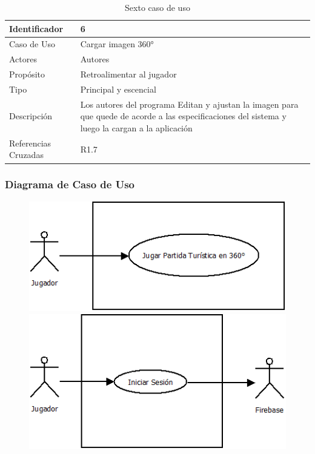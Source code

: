 \begin{table}[H]
    \begin{center}
        \begin{tabular}{| l | m{12cm} |}        
        	\hline 
        	Identificador & 6\\
        	\hline
        	Caso de Uso & Cargar imagen 360°\\
        	\hline
        	Actores & Autores\\
        	\hline
        	Propósito & Retroalimentar al jugador\\
        	\hline
        	Tipo & Principal y escencial\\
        	\hline
        	Descripción & Los autores del programa Editan y ajustan la imagen para que quede de acorde a las especificaciones del sistema y luego la cargan a la aplicación\\
        	\hline
        	Referencias Cruzadas & R1.7\\
        	\hline
        \end{tabular}
    \caption{Sexto caso de uso}
    \end{center}
\end{table}
\subsubsection{Diagrama de Caso de Uso}
\begin{figure}[H]
   \includegraphics[scale=0.5]{imgs/DiagramaCasoUso1.png}
   \includegraphics[scale=0.5]{imgs/DiagramaCasoUso2.png}
\end{figure}

